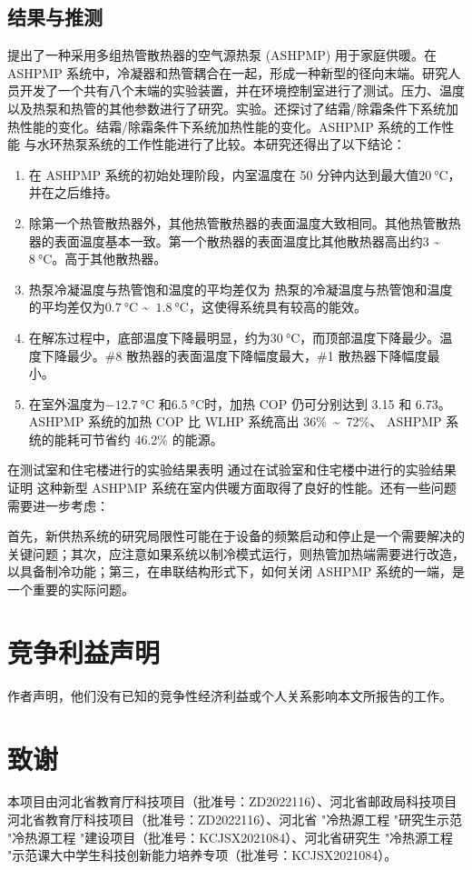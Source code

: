 \subsection{结果与推测}
提出了一种采用多组热管散热器的空气源热泵 (ASHPMP) 用于家庭供暖。在 ASHPMP 系统中，冷凝器和热管耦合在一起，形成一种新型的径向末端。研究人员开发了一个共有八个末端的实验装置，并在环境控制室进行了测试。压力、温度 以及热泵和热管的其他参数进行了研究。实验。还探讨了结霜/除霜条件下系统加热性能的变化。结霜/除霜条件下系统加热性能的变化。ASHPMP 系统的工作性能 与水环热泵系统的工作性能进行了比较。本研究还得出了以下结论：
\begin{enumerate}
	\item 在 ASHPMP 系统的初始处理阶段，内室温度在 50 分钟内达到最大值$\qty{20}{\degreeCelsius} $，并在之后维持。
	\item 除第一个热管散热器外，其他热管散热器的表面温度大致相同。其他热管散热器的表面温度基本一致。第一个散热器的表面温度比其他散热器高出约3 \textasciitilde~$\qty{8}{\degreeCelsius} $。高于其他散热器。
	\item 热泵冷凝温度与热管饱和温度的平均差仅为 热泵的冷凝温度与热管饱和温度的平均差仅为$\qty{0.7}{\degreeCelsius}$ \textasciitilde~$\qty{1.8}{\degreeCelsius} $，这使得系统具有较高的能效。
	\item 在解冻过程中，底部温度下降最明显，约为$\qty{30}{\degreeCelsius} $，而顶部温度下降最少。温度下降最少。\#8 散热器的表面温度下降幅度最大，\#1 散热器下降幅度最小。
	\item 在室外温度为$\qty{-12.7}{\degreeCelsius} $ 和$\qty{6.5}{\degreeCelsius} $时，加热 COP 仍可分别达到 3.15 和 6.73。ASHPMP 系统的加热 COP 比 WLHP 系统高出 36\%~\textasciitilde~72\%、 ASHPMP 系统的能耗可节省约 46.2\% 的能源。
\end{enumerate}

在测试室和住宅楼进行的实验结果表明 通过在试验室和住宅楼中进行的实验结果证明 这种新型 ASHPMP 系统在室内供暖方面取得了良好的性能。还有一些问题需要进一步考虑：

首先，新供热系统的研究局限性可能在于设备的频繁启动和停止是一个需要解决的关键问题；其次，应注意如果系统以制冷模式运行，则热管加热端需要进行改造，以具备制冷功能；第三，在串联结构形式下，如何关闭 ASHPMP 系统的一端，是一个重要的实际问题。

\section*{竞争利益声明}
作者声明，他们没有已知的竞争性经济利益或个人关系影响本文所报告的工作。

\section*{致谢}
本项目由河北省教育厅科技项目（批准号：ZD2022116）、河北省邮政局科技项目
河北省教育厅科技项目（批准号：ZD2022116）、河北省 "冷热源工程 "研究生示范 "冷热源工程 "建设项目（批准号：KCJSX2021084）、河北省研究生 "冷热源工程 "示范课大中学生科技创新能力培养专项（批准号：KCJSX2021084）。


